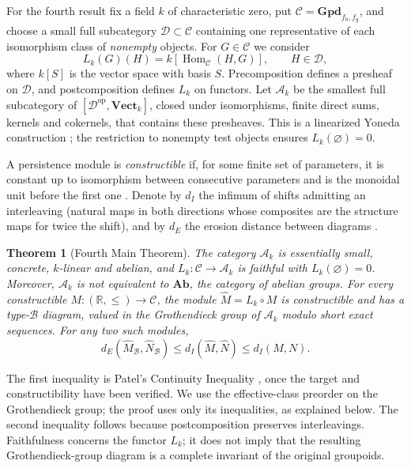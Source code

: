 \documentclass{amsart}
\newtheorem{theorem}{Theorem}[section]
\begin{document}
For the fourth result fix a field $k$ of characteristic zero, put $\mathcal C=\mathbf{Gpd}_{f_0,f_g}$, and choose a small full subcategory $\mathcal D\subset\mathcal C$ containing one representative of each isomorphism class of \emph{nonempty} objects. For $G\in\mathcal C$ we consider
\[
L_k(G)(H)=k[\operatorname{Hom}_{\mathcal C}(H,G)],\qquad H\in\mathcal D,
\]
where $k[S]$ is the vector space with basis $S$. Precomposition defines a presheaf on $\mathcal D$, and postcomposition defines $L_k$ on functors. Let $\mathcal A_k$ be the smallest full subcategory of $[\mathcal D^{\mathrm{op}},\mathbf{Vect}_k]$, closed under isomorphisms, finite direct sums, kernels and cokernels, that contains these presheaves. This is a linearized Yoneda construction \cite[Section~III.2, pp.~61--62]{maclane1998categories}; the restriction to nonempty test objects ensures $L_k(\varnothing)=0$.

A persistence module is \emph{constructible} if, for some finite set of parameters, it is constant up to isomorphism between consecutive parameters and is the monoidal unit before the first one \cite[Definitions~2.1--2.2]{patel2016generalized}. Denote by $d_I$ the infimum of shifts admitting an interleaving (natural maps in both directions whose composites are the structure maps for twice the shift), and by $d_E$ the erosion distance between diagrams \cite[Definitions~3.1--3.2 and 5.1--5.3]{patel2016generalized}.

\begin{theorem}[Fourth Main Theorem]\label{main4}
The category $\mathcal A_k$ is essentially small, concrete, $k$-linear and abelian, and $L_k:\mathcal C\to\mathcal A_k$ is faithful with $L_k(\varnothing)=0$. Moreover, $\mathcal A_k$ is not equivalent to $\mathbf{Ab}$, the category of abelian groups.
For every constructible $M:(\mathbb R,\leq)\to\mathcal C$, the module $\widehat M=L_k\circ M$ is constructible and has a type-$\mathcal B$ diagram, valued in the Grothendieck group of $\mathcal A_k$ modulo short exact sequences. For any two such modules,
\[
d_E(\widehat M_{\mathcal B},\widehat N_{\mathcal B})
\leq d_I(\widehat M,\widehat N)
\leq d_I(M,N).
\]
\end{theorem}

The first inequality is Patel's Continuity Inequality \cite[Theorem~8.2, p.~416]{patel2016generalized}, once the target and constructibility have been verified. We use the effective-class preorder on the Grothendieck group; the proof uses only its inequalities, as explained below. The second inequality follows because postcomposition preserves interleavings. Faithfulness concerns the functor $L_k$; it does not imply that the resulting Grothendieck-group diagram is a complete invariant of the original groupoids.
\end{document}
